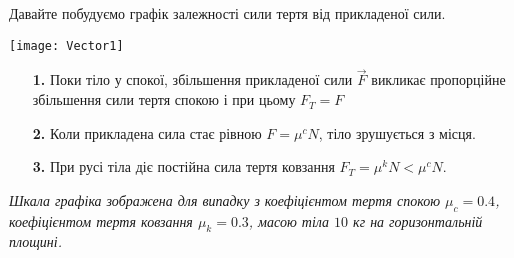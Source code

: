 \documentclass[a4paper,12pt]{article}
\begin{document}
Давайте побудуємо графік залежності сили тертя від прикладеної сили. \begin{center} \texttt{[image: Vector1]} \end{center} \begin{itemize} \item[\textbf{1.}] Поки тіло у спокої, збільшення прикладеної сили $\vec{F}$ викликає пропорційне збільшення сили тертя спокою і при цьому $F_T = F $ \item[\textbf{2.}] Коли прикладена сила стає рівною $F = \mu^c N$, тіло зрушується з місця. \item[\textbf{3.}] При русі тіла діє постійна сила тертя ковзання $F_T = \mu^k N < \mu^c N$. \end{itemize}
\textit{Шкала графіка зображена для випадку з коефіцієнтом тертя спокою $\mu_c = 0.4$, коефіцієнтом тертя ковзання $\mu_k = 0.3$, масою тіла $10$ кг на горизонтальній площині. }
\newpage
\end{document}
